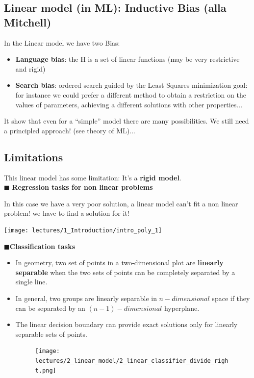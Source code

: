 \documentclass[../main.tex]{subfiles}
\begin{document}
\subsection{Linear model (in ML): Inductive Bias (alla Mitchell)}
In the Linear model we have two Bias:
\begin{itemize}
    \item \textbf{Language bias}: the H is a set of linear functions (may be very restrictive and rigid)

    \item \textbf{Search bias}: ordered search guided by the Least Squares minimization goal: for instance we could prefer a different method to obtain a restriction on the values of parameters, achieving a different solutions with other properties...

\end{itemize}

It show that even for a “simple” model there are many possibilities. We still need a principled approach! (see theory of ML)...

\subsection{Limitations}
This linear model has some limitation: It's a \textbf{rigid model}.\\

\noindent$\blacksquare$ \textbf{Regression tasks for non linear problems}\\

\begin{minipage}{0.5\textwidth}
In this case we have a very poor solution, a linear model can't fit a non linear problem! we have to find a solution for it!
\end{minipage}
\hfill
\begin{minipage}{0.5\textwidth}
\texttt{[image: lectures/1\_Introduction/intro\_poly\_1]}
\end{minipage}
\newpage

\noindent$\blacksquare$\textbf{Classification tasks}
\begin{itemize}
    \item In geometry, two set of points in a two-dimensional plot are \textbf{linearly separable} when the two sets of points can be completely separated by a single line.
    \item In general, two groups are linearly separable in $n-dimensional$ space if they can be separated by an $(n-1)-dimensional$ hyperplane.
    \item The linear decision boundary can provide exact solutions only for linearly separable sets of points.
    \begin{figure}[H]
        \centering
        \texttt{[image: lectures/2\_linear\_model/2\_linear\_classifier\_divide\_right.png]}
    \end{figure}
\end{itemize}
\end{document}
